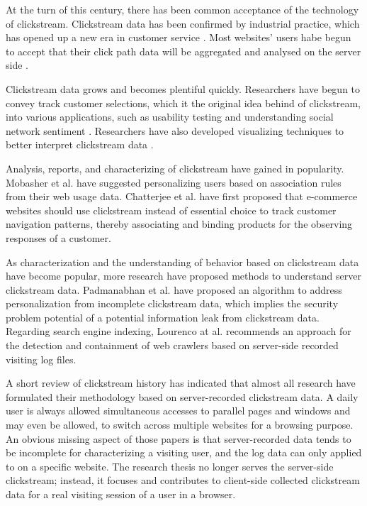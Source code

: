 At the turn of this century, there has been common acceptance of the technology of clickstream.
Clickstream data has been confirmed by industrial practice, which has opened up a new era in 
customer service \cite{walsh2000internet}. Most websites' users habe begun to accept that 
their click path data will be aggregated and analysed on the server side \cite{carr2000hypermediation}.

Clickstream data grows and becomes plentiful quickly. Researchers have begun to convey 
track customer selections, which it the original idea behind of clickstream,
into various applications, such as usability testing \cite{Waterson:2002:LOW:506443.506602}
and understanding social network sentiment \cite{Schneider:2009:UOS:1644893.1644899}.
Researchers have also developed visualizing
techniques to better interpret clickstream data \cite{Waterson:2002:DTU:1556262.1556276}.

Analysis, reports, and characterizing of clickstream have gained in popularity. 
Mobasher et al. \cite{Mobasher:2001:EPB:502932.502935}
have suggested personalizing users based on association rules from their web usage data. 
Chatterjee et al. \cite{chatterjee2003modeling} 
have first proposed that e-commerce websites should use clickstream instead of essential choice 
to track customer navigation patterns, thereby 
associating and binding products for the observing responses of a customer.

As characterization and the understanding of behavior based on clickstream data have become popular, 
more research have proposed methods to understand server clickstream data.
Padmanabhan et al. \cite{Padmanabhan:2001:PID:502512.502535} have
proposed an algorithm to address personalization from incomplete clickstream data, which implies
the security problem potential of a potential information leak from clickstream data. 
Regarding search engine indexing, Lourenco at al. \cite{Lourenco:2006:CWC:1145581.1145634} recommends an approach for
the detection and containment of web crawlers based on server-side recorded visiting log files.

A short review of clickstream history has indicated that almost all research have formulated their 
methodology based on server-recorded clickstream data.
A daily user is always allowed simultaneous accesses to parallel pages and windows and may even be allowed,
to switch across multiple websites for a browsing purpose.
An obvious missing aspect of those papers is that server-recorded data tends to be incomplete for 
characterizing a visiting user, and the log data can only applied to on a specific website. 
The research thesis no longer serves the server-side clickstream; instead, it
focuses and contributes to client-side collected clickstream data 
for a real visiting session of a user in a browser.

